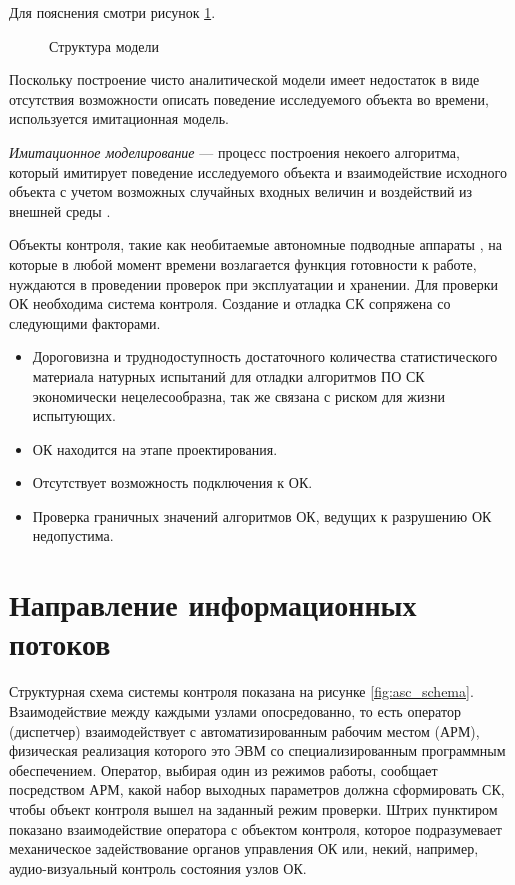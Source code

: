 Для пояснения смотри рисунок \ref{fig:submodels_asu_tp}.

\begin{center}
    \begin{figure}[hb]
        \caption{Структура модели}\label{fig:submodels_asu_tp}
    \end{figure}
\end{center}

Поскольку построение чисто аналитической модели имеет недостаток  в виде отсутствия возможности
описать поведение исследуемого объекта во времени, используется имитационная модель.

\textit{Имитационное моделирование} --- процесс построения некоего алгоритма, который имитирует
поведение исследуемого объекта и взаимодействие исходного объекта с учетом возможных случайных входных величин и
воздействий из внешней среды \cite{book:vvedeni_imit_model_1987}.

Объекты контроля, такие как
    необитаемые автономные подводные аппараты \todo{\ldots},
на которые в любой момент времени возлагается функция готовности к  работе,
нуждаются в проведении проверок при эксплуатации и хранении.
Для проверки ОК необходима система контроля. Создание и отладка СК сопряжена со следующими факторами.
\begin{itemize}
    \item Дороговизна и труднодоступность достаточного количества статистического материала
    натурных испытаний для отладки алгоритмов ПО СК экономически нецелесообразна, так же связана с риском для жизни испытующих.
    \item ОК находится на этапе проектирования.
    \item Отсутствует возможность подключения к ОК.
    \item Проверка граничных значений алгоритмов ОК, ведущих к разрушению ОК недопустима.
\end{itemize}



\section{Направление информационных потоков} %

Структурная схема системы контроля показана на рисунке \ref{fig:asc_schema}.
Взаимодействие между каждыми узлами опосредованно, то есть
оператор (диспетчер) взаимодействует с автоматизированным рабочим местом (АРМ),
физическая реализация которого это ЭВМ со специализированным программным обеспечением.
Оператор, выбирая один из режимов работы, сообщает посредством АРМ,
какой набор выходных параметров должна сформировать СК, чтобы объект контроля вышел на заданный режим проверки.
Штрих пунктиром показано взаимодействие оператора с объектом контроля,
которое подразумевает механическое задействование органов управления ОК
или, некий, например, аудио-визуальный контроль состояния узлов ОК.


